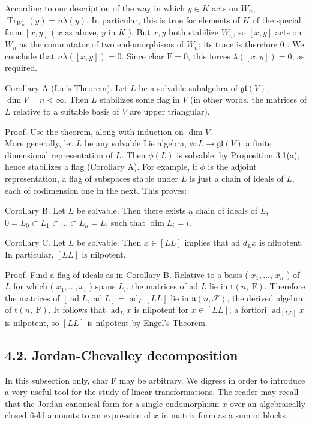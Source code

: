 \documentclass[10pt]{article}
\begin{document}
According to our description of the way in which $y \in K$ acts on $W_{n}$, $\operatorname{Tr}_{W_{n}}(y)=n \lambda(y)$. In particular, this is true for elements of $K$ of the special form $[x, y]$ ( $x$ as above, $y$ in $K$ ). But $x, y$ both stabilize $W_{n}$, so $[x, y]$ acts on $W_{n}$ as the commutator of two endomorphisms of $W_{n}$; its trace is therefore 0 . We conclude that $n \lambda([x, y])=0$. Since char $\mathrm{F}=0$, this forces $\lambda([x, y])=0$, as required.

Corollary A (Lie's Theorem). Let $L$ be a solvable subalgebra of $\mathfrak{g l}(V)$, $\operatorname{dim} V=n<\infty$. Then $L$ stabilizes some flag in $V$ (in other words, the matrices of $L$ relative to a suitable basis of $V$ are upper triangular).

Proof. Use the theorem, along with induction on $\operatorname{dim} V$.\\
More generally, let $L$ be any solvable Lie algebra, $\phi: L \rightarrow \mathfrak{g l}(V)$ a finite dimensional representation of $L$. Then $\phi(L)$ is solvable, by Proposition 3.1(a), hence stabilizes a flag (Corollary A). For example, if $\phi$ is the adjoint representation, a flag of subspaces stable under $L$ is just a chain of ideals of $L$, each of codimension one in the next. This proves:

Corollary B. Let $L$ be solvable. Then there exists a chain of ideals of $L$, $0=L_{0} \subset L_{1} \subset \ldots \subset L_{n}=L$, such that $\operatorname{dim} L_{i}=i$.

Corollary C. Let $L$ be solvable. Then $x \in[L L]$ implies that ad $d_{L} x$ is nilpotent. In particular, $[L L]$ is nilpotent.

Proof. Find a flag of ideals as in Corollary B. Relative to a basis ( $x_{1}, \ldots$, $x_{n}$ ) of $L$ for which ( $x_{1}, \ldots, x_{i}$ ) spans $L_{i}$, the matrices of ad $L$ lie in $\mathrm{t}(n, \mathrm{~F})$. Therefore the matrices of $[\operatorname{ad} L, \operatorname{ad} L]=\operatorname{ad}_{L}[L L]$ lie in $\mathfrak{n}(n, \mathcal{F})$, the derived algebra of $\mathrm{t}(n, \mathrm{~F})$. It follows that $\operatorname{ad}_{L} x$ is nilpotent for $x \in[L L]$; a fortiori $\operatorname{ad}_{[L L]} x$ is nilpotent, so $[L L]$ is nilpotent by Engel's Theorem.

\subsection*{4.2. Jordan-Chevalley decomposition}
In this subsection only, char F may be arbitrary. We digress in order to introduce a very useful tool for the study of linear transformations. The reader may recall that the Jordan canonical form for a single endomorphism $x$ over an algebraically closed field amounts to an expression of $x$ in matrix form as a sum of blocks
\end{document}
